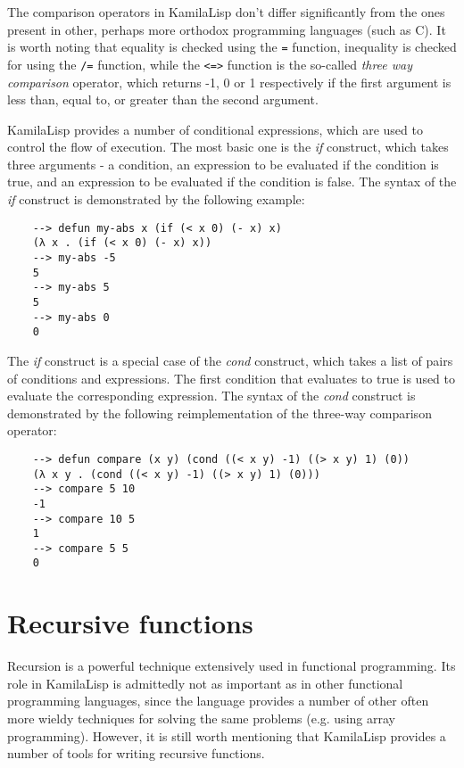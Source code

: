 The comparison operators in KamilaLisp don't differ significantly from the ones present in other, perhaps more orthodox programming languages (such as C). It is worth noting that equality is checked using the \verb|=| function, inequality is checked for using the \verb|/=| function, while the \verb|<=>| function is the so-called \textit{three way comparison} operator, which returns -1, 0 or 1 respectively if the first argument is less than, equal to, or greater than the second argument.

KamilaLisp provides a number of conditional expressions, which are used to control the flow of execution. The most basic one is the \textit{if} construct, which takes three arguments - a condition, an expression to be evaluated if the condition is true, and an expression to be evaluated if the condition is false. The syntax of the \textit{if} construct is demonstrated by the following example:

\begin{Verbatim}
    --> defun my-abs x (if (< x 0) (- x) x)
    (λ x . (if (< x 0) (- x) x))
    --> my-abs -5
    5
    --> my-abs 5
    5
    --> my-abs 0
    0
\end{Verbatim}

The \textit{if} construct is a special case of the \textit{cond} construct, which takes a list of pairs of conditions and expressions. The first condition that evaluates to true is used to evaluate the corresponding expression. The syntax of the \textit{cond} construct is demonstrated by the following reimplementation of the three-way comparison operator:

\begin{Verbatim}
    --> defun compare (x y) (cond ((< x y) -1) ((> x y) 1) (0))
    (λ x y . (cond ((< x y) -1) ((> x y) 1) (0)))
    --> compare 5 10
    -1
    --> compare 10 5
    1
    --> compare 5 5
    0
\end{Verbatim}

\section{Recursive functions}

Recursion is a powerful technique extensively used in functional programming. Its role in KamilaLisp is admittedly not as important as in other functional programming languages, since the language provides a number of other often more wieldy techniques for solving the same problems (e.g. using array programming). However, it is still worth mentioning that KamilaLisp provides a number of tools for writing recursive functions.

